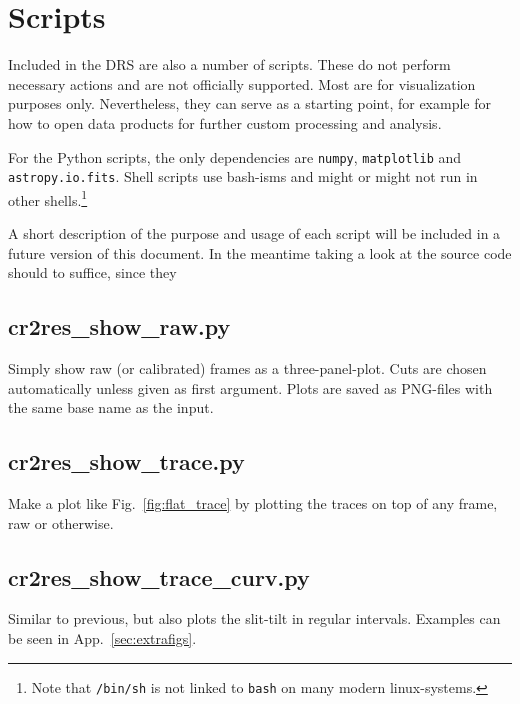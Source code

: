 \section{Scripts}
\label{sec:scripts}

Included in the DRS are also a number of scripts. These do not perform necessary
actions and are not officially supported. Most are for visualization purposes
only. Nevertheless, they can serve as a starting point, for example for how to
open data products for further custom processing and analysis.

For the Python scripts, the only dependencies are \texttt{numpy},
\texttt{matplotlib} and \texttt{astropy.io.fits}. Shell scripts use bash-isms
and might or might not run in other shells.\footnote{Note that \texttt{/bin/sh}
is not linked to \texttt{bash} on many modern linux-systems.}

A short description of the purpose and usage of each script will be included in
a future version of this document. In the meantime taking a look at the source
code should to suffice, since they 


\subsection{cr2res\_show\_raw.py}
Simply show raw (or calibrated) frames as a three-panel-plot. Cuts are chosen automatically unless given as first argument. Plots are saved as PNG-files with the same base name as the input.
\begin{shell}
\end{shell}

\subsection{cr2res\_show\_trace.py}
Make a plot like Fig.~\ref{fig:flat_trace} by plotting the traces on top of any
frame, raw or otherwise.

\subsection{cr2res\_show\_trace\_curv.py}
Similar to previous, but also plots the slit-tilt in regular intervals. Examples
can be seen in App.~\ref{sec:extrafigs}.

